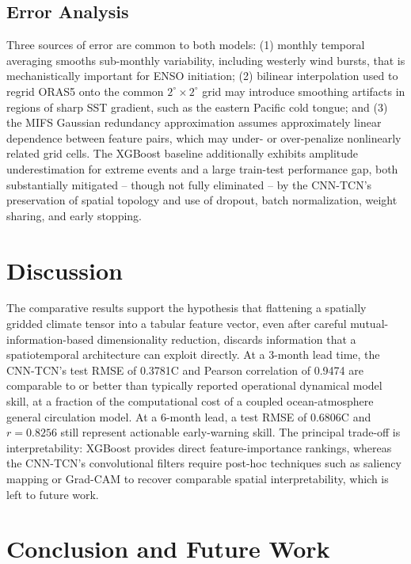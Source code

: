 \documentclass[conference]{IEEEtran}
\begin{document}
\subsection{Error Analysis}
Three sources of error are common to both models: (1) monthly temporal averaging smooths sub-monthly variability, including westerly wind bursts, that is mechanistically important for ENSO initiation; (2) bilinear interpolation used to regrid ORAS5 onto the common $2^{\circ}\times2^{\circ}$ grid may introduce smoothing artifacts in regions of sharp SST gradient, such as the eastern Pacific cold tongue; and (3) the MIFS Gaussian redundancy approximation assumes approximately linear dependence between feature pairs, which may under- or over-penalize nonlinearly related grid cells. The XGBoost baseline additionally exhibits amplitude underestimation for extreme events and a large train-test performance gap, both substantially mitigated -- though not fully eliminated -- by the CNN-TCN's preservation of spatial topology and use of dropout, batch normalization, weight sharing, and early stopping.

\section{Discussion}

The comparative results support the hypothesis that flattening a spatially gridded climate tensor into a tabular feature vector, even after careful mutual-information-based dimensionality reduction, discards information that a spatiotemporal architecture can exploit directly. At a 3-month lead time, the CNN-TCN's test RMSE of 0.3781\textdegree C and Pearson correlation of 0.9474 are comparable to or better than typically reported operational dynamical model skill, at a fraction of the computational cost of a coupled ocean-atmosphere general circulation model. At a 6-month lead, a test RMSE of 0.6806\textdegree C and $r=0.8256$ still represent actionable early-warning skill. The principal trade-off is interpretability: XGBoost provides direct feature-importance rankings, whereas the CNN-TCN's convolutional filters require post-hoc techniques such as saliency mapping or Grad-CAM to recover comparable spatial interpretability, which is left to future work.

\section{Conclusion and Future Work}
\end{document}
